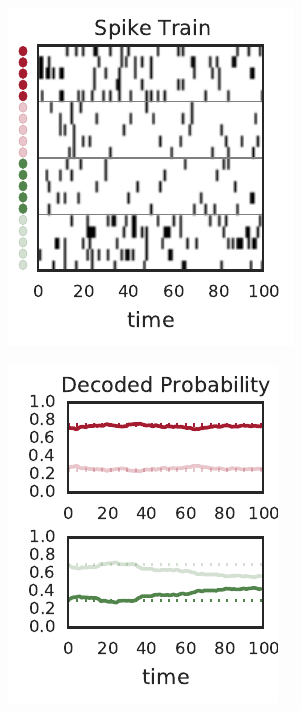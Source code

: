 \begin{figure}[t!]
\begin{subfigure}[b]{1.9in}
    \includegraphics[width=\textwidth]{figures/ch7/example_spiketrain}
    \label{fig:representation_spiketrain}
  \end{subfigure}
  \begin{subfigure}[b]{1.8in}
    \centering
    \caption{}
    \vspace{-.3in}
    \includegraphics[width=\textwidth]{figures/ch7/example_prs}

\end{subfigure}
\end{figure}
